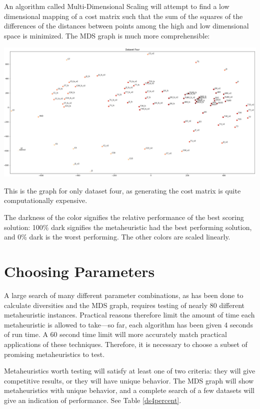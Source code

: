 \documentclass[11pt, letterpaper, onecolumn]{article}
\begin{document}
An algorithm called Multi-Dimensional Scaling will attempt to find a low dimensional mapping of a cost matrix such that the sum of the squares of the differences of the distances between points among the high and low dimensional space is minimized. The MDS graph is much more comprehensible:

\includegraphics[width=\linewidth]{graphs/ds4_matrix.png}

This is the graph for only dataset four, as generating the cost matrix is quite computationally expensive. 

The darkness of the color signifies the relative performance of the best scoring solution: 100\% dark signifies the metaheuristic had the best performing solution, and 0\% dark is the worst performing. The other colors are scaled linearly.  

\section{Choosing Parameters}

A large search of many different parameter combinations, as has been done to calculate diversities and the MDS graph, requires testing of nearly 80 different metaheuristic instances. Practical reasons therefore limit the amount of time each metaheuristic is allowed to take---so far, each algorithm has been given 4 seconds of run time. A 60 second time limit will more accurately match practical applications of these techniques. Therefore, it is necessary to choose a subset of promising metaheuristics to test. 

Metaheuristics worth testing will satisfy at least one of two criteria: they will give competitive results, or they will have unique behavior. The MDS graph will show metaheuristics with unique behavior, and a complete search of a few datasets will give an indication of performance. See Table \ref{ds4percent}.
\end{document}
